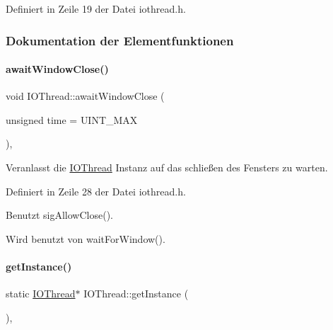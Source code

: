 Definiert in Zeile 19 der Datei iothread.\+h.



\subsubsection{Dokumentation der Elementfunktionen}
\mbox{\label{classIOThread_aef03d0e0e96b2add5f8290232bd96716}} 
\paragraph{\texorpdfstring{await\+Window\+Close()}{awaitWindowClose()}}
{\footnotesize\ttfamily void I\+O\+Thread\+::await\+Window\+Close (\begin{DoxyParamCaption}\item[{unsigned}]{time = {\ttfamily UINT\+\_\+MAX} }\end{DoxyParamCaption})\hspace{0.3cm}{\ttfamily [inline]}, {\ttfamily [private]}}



Veranlasst die \mbox{\hyperlink{classIOThread}{I\+O\+Thread}} Instanz auf das schließen des Fensters zu warten. 



Definiert in Zeile 28 der Datei iothread.\+h.



Benutzt sig\+Allow\+Close().



Wird benutzt von wait\+For\+Window().

\mbox{\label{classIOThread_a99c8f19b8b37cc58f0d7b7458de7631e}} 
\paragraph{\texorpdfstring{get\+Instance()}{getInstance()}}
{\footnotesize\ttfamily static \mbox{\hyperlink{classIOThread}{I\+O\+Thread}}$\ast$ I\+O\+Thread\+::get\+Instance (\begin{DoxyParamCaption}{ }\end{DoxyParamCaption})\hspace{0.3cm}{\ttfamily [inline]}, {\ttfamily [static]}}



